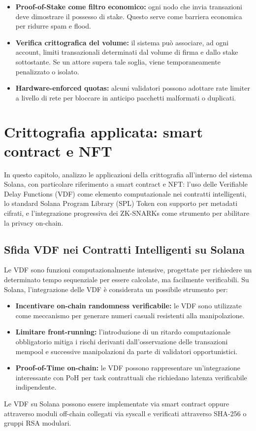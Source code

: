 \documentclass[a4paper,12pt]{report}
\begin{document}
	\begin{itemize}
		\item \textbf{Proof-of-Stake come filtro economico:} ogni nodo che invia transazioni deve dimostrare il possesso di stake. Questo serve come barriera economica per ridurre spam e flood.
		\item \textbf{Verifica crittografica del volume:} il sistema può associare, ad ogni account, limiti transazionali determinati dal volume di firma e dallo stake sottostante. Se un attore supera tale soglia, viene temporaneamente penalizzato o isolato.
		\item \textbf{Hardware-enforced quotas:} alcuni validatori possono adottare rate limiter a livello di rete per bloccare in anticipo pacchetti malformati o duplicati.
	\end{itemize}
	
	\chapter{Crittografia applicata: smart contract e NFT}
	In questo capitolo, analizzo le applicazioni della crittografia all'interno del sistema Solana, con particolare riferimento a smart contract e NFT: l'uso delle Verifiable Delay Functions (VDF) come elemento computazionale nei contratti intelligenti, lo standard Solana Program Library (SPL) Token con supporto per metadati cifrati, e l’integrazione progressiva dei ZK-SNARKs come strumento per abilitare la privacy on-chain.
	
	\section{Sfida VDF nei Contratti Intelligenti su Solana}
	Le VDF sono funzioni computazionalmente intensive, progettate per richiedere un determinato tempo sequenziale per essere calcolate, ma facilmente verificabili. Su Solana, l’integrazione delle VDF è considerata un possibile strumento per:
	\begin{itemize}
		\item \textbf{Incentivare on-chain randomness verificabile:} le VDF sono utilizzate come meccanismo per generare numeri casuali resistenti alla manipolazione.
		\item \textbf{Limitare front-running:} l’introduzione di un ritardo computazionale obbligatorio mitiga i rischi derivanti dall’osservazione delle transazioni mempool e successive manipolazioni da parte di validatori opportunistici.
		\item \textbf{Proof-of-Time on-chain:} le VDF possono rappresentare un’integrazione interessante con PoH per task contrattuali che richiedano latenza verificabile indipendente.
	\end{itemize}
	Le VDF su Solana possono essere implementate via smart contract oppure attraverso moduli off-chain collegati via syscall e verificati attraverso SHA-256 o gruppi RSA modulari.
	
\end{document}
